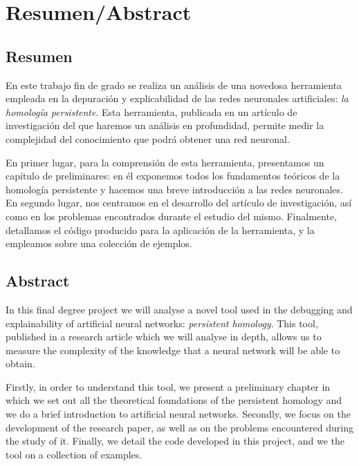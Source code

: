 \documentclass[12pt, a4paper, twoside]{book}
\numberwithin{equation}{section}
\theoremstyle{definition}
\theoremstyle{remark}
\theoremstyle{plain}
\begin{document}
	
	
	\pagestyle{main}

	
	
	\chapter*{Resumen/Abstract}
	\section*{Resumen}
	En este trabajo fin de grado se realiza un análisis de una novedosa 
	herramienta empleada en la depuración y explicabilidad de las redes 
	neuronales artificiales: \emph{la homología persistente}. Esta 
	herramienta, publicada en un artículo de investigación del que haremos 
	un análisis en profundidad, permite medir la complejidad del 
	conocimiento que podrá obtener una red neuronal. 

	En primer lugar, para la comprensión de esta herramienta, presentamos 
	un capítulo de preliminares: en él exponemos todos los fundamentos 
	teóricos de la homología persistente y hacemos una breve introducción a 
	las redes neuronales. En segundo lugar, nos centramos en el desarrollo 
	del artículo de investigación, así como en los problemas encontrados 
	durante el estudio del mismo. Finalmente, detallamos el código 
	producido para la aplicación de la herramienta, y la empleamos sobre 
	una colección de ejemplos. 
	\section*{Abstract}
	In this final degree project we will analyse a novel tool used in the 
	debugging and explainability of artificial neural networks: 
	\emph{persistent homology}. This tool, published in a research article 
	which we will analyse in depth, allows us to measure the complexity of 
	the knowledge that a neural network will be able to obtain. 

	Firstly, in order to understand this tool, we present 
	a preliminary chapter in which we set out all the theoretical 
	foundations of the persistent homology and we do a brief introduction 
	to artificial neural networks. Secondly, we focus on the development 
	of the research paper, as well as on the problems encountered during 
	the study of it. Finally, we detail the code developed in this project, 
	and we the tool on a collection of examples.  
\end{document}
